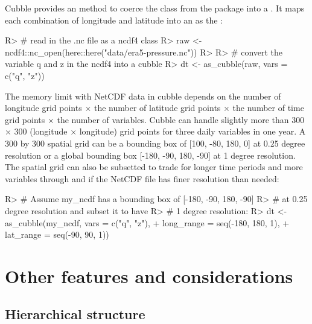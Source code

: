 \documentclass[
]{jss}
\begin{document}
Cubble provides an  method to coerce the  class from the  package into a . It maps each combination of longitude and latitude into an  as the :

\begin{CodeChunk}
\begin{CodeInput}
R> # read in the .nc file as a ncdf4 class
R> raw <- ncdf4::nc_open(here::here("data/era5-pressure.nc"))
R> 
R> # convert the variable q and z in the ncdf4 into a cubble
R> dt <- as_cubble(raw, vars = c("q", "z"))
\end{CodeInput}
\end{CodeChunk}

The memory limit with NetCDF data in cubble depends on the number of longitude grid points \(\times\) the number of latitude grid points \(\times\) the number of time grid points \(\times\) the number of variables. Cubble can handle slightly more than 300 \(\times\) 300 (longitude \(\times\) longitude) grid points for three daily variables in one year. A 300 by 300 spatial grid can be a bounding box of {[}100, -80, 180, 0{]} at 0.25 degree resolution or a global bounding box {[}-180, -90, 180, -90{]} at 1 degree resolution. The spatial grid can also be subsetted to trade for longer time periods and more variables through  and  if the NetCDF file has finer resolution than needed:

\begin{CodeChunk}
\begin{CodeInput}
R> # Assume my_ncdf has a bounding box of [-180, -90, 180, -90]
R> # at 0.25 degree resolution and subset it to have
R> # 1 degree resolution:
R> dt <- as_cubble(my_ncdf, vars = c("q", "z"),
+                 long_range = seq(-180, 180, 1),
+                 lat_range = seq(-90, 90, 1))
\end{CodeInput}
\end{CodeChunk}

\hypertarget{others}{%
\section{Other features and considerations}\label{others}}

\hypertarget{hierarchical-structure}{%
\subsection{Hierarchical structure}\label{hierarchical-structure}}
\end{document}
